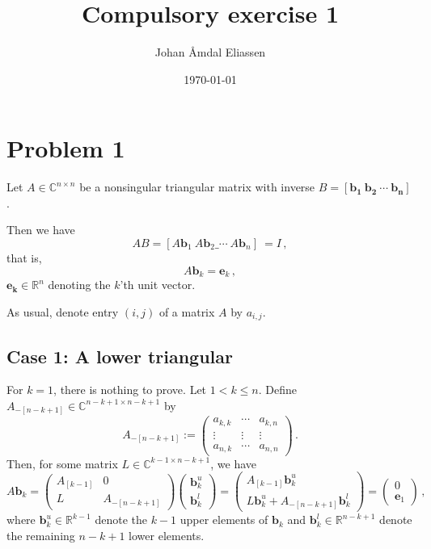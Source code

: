 \documentclass[11pt]{amsart}
\theoremstyle{definition}
\newcommand{\C}{\mathbb{C}}
\newcommand{\R}{\mathbb{R}}
\numberwithin{equation}{section}
\begin{document}
\title[MAT-INF4130]{Compulsory exercise 1}

\author{Johan Åmdal Eliassen}

\maketitle
{}

\date{\today}
\keywords{}

\section{Problem 1}
Let $A \in \C^{n\times n}$ be a nonsingular triangular matrix with inverse $B = [\mathbf{b_1}\: \mathbf{b_2}\: \cdots \:\mathbf{b_n}]$.

Then we have
\begin{equation}
AB =
[
A \mathbf{b}_1\: A \mathbf{b}_2 \_\cdots \:A\mathbf{b}_n
]\ = I\,,
\end{equation}
that is,
\begin{equation}
A\mathbf{b}_k = \mathbf{e}_k\,,
\end{equation}
$\mathbf{e_k} \in \R^n$ denoting the $k$'th unit vector.

As usual, denote entry $(i,j)$ of a matrix $A$ by $a_{i,j}$.

\subsection*{Case 1: A lower triangular}
For $k = 1$, there is nothing to prove. 
Let $1 < k \leq n$. Define $A_{-[n-k+1]} \in \C^{n-k+1 \times n - k +1}$ by
\begin{equation}
A_{-[n-k+1]}
:= 
\left(
\begin{matrix}
a_{k,k} &\cdots &a_{k, n} \\
\vdots &\vdots & \vdots \\
a_{n,k} & \cdots &a_{n,n}
\end{matrix}
\right)\,.
\end{equation}
Then, for some matrix $L \in \C^{k-1 \times n-k+1}$, we have
\begin{equation}
A \mathbf{b}_k =
\left(
\begin{matrix}
A_{[k-1]} & 0 \\
L & A_{-[n-k+1]}
\end{matrix}
\right)
\left(
\begin{matrix}
\mathbf{b}_k^u \\
\mathbf{b}_k^l
\end{matrix}
\right)
= 
\left(
\begin{matrix}
A_{[k-1]}\mathbf{b}_k^u \\
L\mathbf{b}_k^u + A_{-[n-k+1]}\mathbf{b}_k^l
\end{matrix}
\right)
=
\left(
\begin{matrix}
0 \\ \mathbf{e}_1
\end{matrix}
\right)\,,
\end{equation}
where $\mathbf{b}_k^u \in \R^{k-1}$ denote the $k-1$ upper elements of $\mathbf{b}_k$ and $\mathbf{b}_k^l \in \R^{n-k+1}$ denote the remaining $n-k+1$ lower elements.
\end{document}
